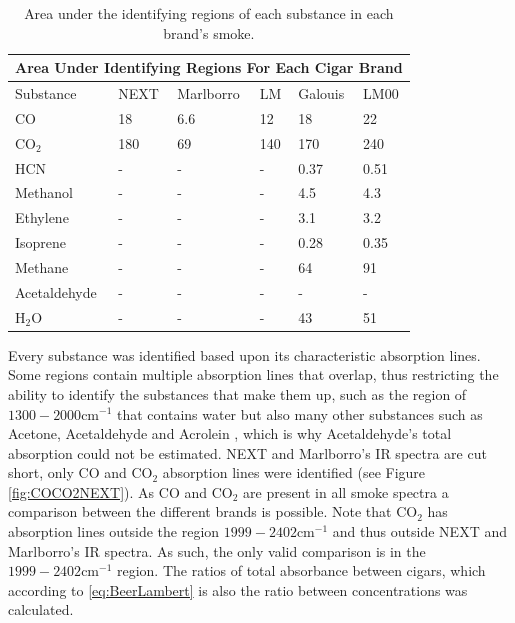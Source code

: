 \documentclass[reprint,amsmath,amssymb,aps, prl]{revtex4-2}
\begin{document}
\begin{table}[h]
    \begin{tabular}{ |p{1.9cm}|p{1.3cm}|p{1.5cm}|p{1.0cm}|p{1.2cm}|p{1.1cm}|  }
     \hline
     \multicolumn{6}{|c|}{Area Under Identifying Regions For Each Cigar Brand} \\ \hline
        Substance   & NEXT  & Marlborro & LM    & Galouis   & LM00\\ \hline
        CO          & 18    & 6.6       & 12    & 18        & 22 \\ \hline %
     $\text{CO}_{2}$& 180   & 69        & 140   & 170       & 240 \\ \hline
     HCN            & -     & -         & -     & 0.37      & 0.51 \\ \hline %
     Methanol       & -     & -         & -     & 4.5       & 4.3 \\ \hline %
     Ethylene       & -     & -         & -     & 3.1       & 3.2 \\ \hline %
     Isoprene       & -     & -         & -     & 0.28      & 0.35 \\ \hline %
     Methane        & -     & -         & -     & 64        & 91 \\ \hline %
     Acetaldehyde   & -     & -         & -     & -         & - \\ \hline %
     $\text{H}_{2}$O& -     & -         & -     & 43        & 51 \\ \hline
    \end{tabular}
    \caption{Area under the identifying regions of each substance in each brand's smoke.}
    \label{tbl:CigarSubstanceAreas}
\end{table}

Every substance was identified based upon its characteristic absorption lines\cite{NISTwebook}\cite{IRCEllSMOKE}. 
Some regions contain multiple absorption lines that overlap, thus restricting the ability to identify the substances that make them up, such as the region of $1300-2000\text{cm}^{-1}$ that contains water but also many other substances such as Acetone, Acetaldehyde and Acrolein \cite{FTIRSPECTRAOFSMOKE}, which is why Acetaldehyde's total absorption could not be estimated. 
NEXT and Marlborro's IR spectra are cut short, only CO and $\text{CO}_{2}$ absorption lines were identified (see Figure \ref{fig:COCO2NEXT}).
As CO and $\text{CO}_{2}$ are present in all smoke spectra a comparison between the different brands is possible. Note that $\text{CO}_{2}$ has absorption lines outside the region $1999-2402 \text{cm}^{-1}$ and thus outside NEXT and Marlborro's IR spectra. As such, the only valid comparison is in the $1999-2402 \text{cm}^{-1}$ region. The ratios of total absorbance between cigars, which according to \ref{eq:BeerLambert} is also the ratio between concentrations was calculated.
\end{document}
